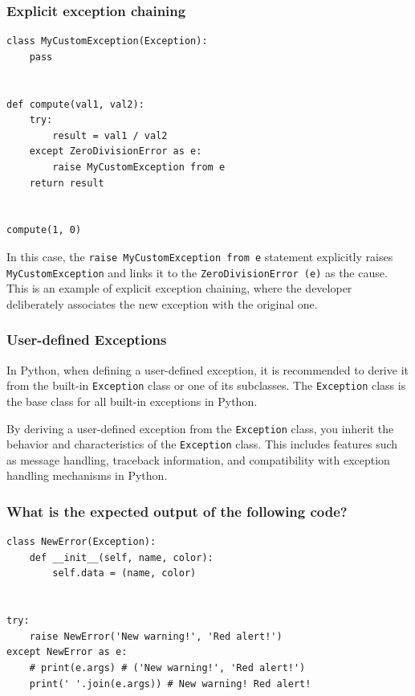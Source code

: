 \subsubsection{Explicit exception chaining}
\begin{codebox}
\begin{verbatim}
class MyCustomException(Exception):
    pass
 
 
def compute(val1, val2):
    try:
        result = val1 / val2
    except ZeroDivisionError as e:
        raise MyCustomException from e
    return result
 
 
compute(1, 0)
\end{verbatim}
\end{codebox}
In this case, the \texttt{raise MyCustomException from e} statement explicitly raises \texttt{MyCustomException} and links it to the \texttt{ZeroDivisionError (e)} as the cause. This is an example of explicit exception chaining, where the developer deliberately associates the new exception with the original one.

\newpage
\subsubsection{User-defined Exceptions}
In Python, when defining a user-defined exception, it is recommended to derive it from the built-in \texttt{Exception} class or one of its subclasses. The \texttt{Exception} class is the base class for all built-in exceptions in Python.

By deriving a user-defined exception from the \texttt{Exception} class, you inherit the behavior and characteristics of the \texttt{Exception} class. This includes features such as message handling, traceback information, and compatibility with exception handling mechanisms in Python.

\subsubsection{What is the expected output of the following code?}
\begin{codebox}
\begin{verbatim}
class NewError(Exception):
    def __init__(self, name, color):
        self.data = (name, color)
 
 
try:
    raise NewError('New warning!', 'Red alert!')
except NewError as e:
    # print(e.args) # ('New warning!', 'Red alert!')
    print(' '.join(e.args)) # New warning! Red alert!
\end{verbatim}
\end{codebox}

